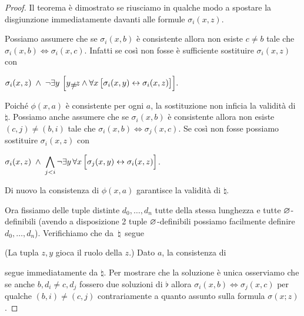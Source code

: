 \begin{proof}

Il teorema \`e dimostrato se riusciamo in qualche modo a spostare la disgiunzione immediatamente davanti alle formule $\sigma_i(x,z)$. 

Possiamo assumere che se $\sigma_i(x,b)$ \`e consistente allora non esiste $c\neq b$ tale che $\sigma_i(x,b)\iff\sigma_i(x,c)$. Infatti se cos\`i non fosse \`e sufficiente sostituire $\sigma_i(x,z)$ con  



\hfil$\displaystyle\sigma_i(x,z) \;\wedge\; \neg\E y\ \Big[y\neq z\wedge \A x\,\big[\sigma_i(x,y)\iff\sigma_i(x,z)\big]\Big].$

Poich\'e $\phi(x,a)$ \`e consistente per ogni $a$, la sostituzione non inficia la validit\`a di $\natural$. Possiamo anche assumere che se $\sigma_i(x,b)$ \`e consistente allora non esiste $(c,j)\neq (b,i)$ tale che $\sigma_i(x,b)\iff\sigma_j(x,c)$. Se cos\`i non fosse possiamo sostituire $\sigma_i(x,z)$ con

\hfil$\displaystyle\sigma_i(x,z) \;\wedge\; \bigwedge_{j<i}\neg\exists y\,\forall x\,\Big[\sigma_j(x,y)\leftrightarrow\sigma_i(x,z)\Big]$.

Di nuovo la consistenza di $\phi(x,a)$ garantisce la validit\`a di $\natural$.

Ora fissiamo delle tuple distinte $d_0,\dots, d_n$ tutte della stessa lunghezza e tutte $\varnothing$-definibili (avendo a disposizione 2 tuple $\varnothing$-definibili possiamo facilmente definire $d_0,\dots, d_n$). Verifichiamo che da $\,\natural\,$ segue


(La tupla $z,y$ gioca il ruolo della $z$.)  Dato $a$, la consistenza di  


segue immediatamente da $\natural$. Per mostrare che la soluzione \`e unica osserviamo che se anche $b,d_i\neq c,d_j$ fossero due soluzioni di $\flat$ allora $\sigma_i(x,b)\iff\sigma_j(x,c)$ per qualche $(b,i)\neq (c,j)$ contrariamente a quanto assunto sulla formula $\sigma(x;z)$.
\end{proof}


